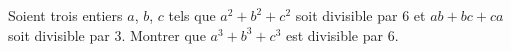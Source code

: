 Soient trois entiers $a$, $b$, $c$ tels que $a^2 + b^2 + c^2$ soit divisible par $6$ et $ab + bc + ca$ soit divisible par $3$. Montrer que $a^3 + b^3 + c^3$ est divisible par $6$.

